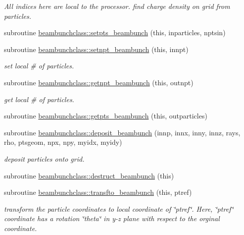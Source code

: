 \begin{DoxyCompactItemize}
\begin{DoxyCompactList}\small\item\em All indices here are local to the processor. find charge density on grid from particles. \end{DoxyCompactList}\item 
subroutine \mbox{\hyperlink{namespacebeambunchclass_a2cf9a1a04b69a4b2509d80522112a3bd}{beambunchclass\+::setpts\+\_\+beambunch}} (this, inparticles, nptsin)
\item 
subroutine \mbox{\hyperlink{namespacebeambunchclass_af1b14b706bd1283ff6c5a7cec4b06c48}{beambunchclass\+::setnpt\+\_\+beambunch}} (this, innpt)
\begin{DoxyCompactList}\small\item\em set local \# of particles. \end{DoxyCompactList}\item 
subroutine \mbox{\hyperlink{namespacebeambunchclass_aec332b229b76111b68db82b20ab2846e}{beambunchclass\+::getnpt\+\_\+beambunch}} (this, outnpt)
\begin{DoxyCompactList}\small\item\em get local \# of particles. \end{DoxyCompactList}\item 
subroutine \mbox{\hyperlink{namespacebeambunchclass_abc601844eaf85727173ebd3ef6d2b256}{beambunchclass\+::getpts\+\_\+beambunch}} (this, outparticles)
\item 
subroutine \mbox{\hyperlink{namespacebeambunchclass_aa0438cba132ce3b2fdc8e053375c0097}{beambunchclass\+::deposit\+\_\+beambunch}} (innp, innx, inny, innz, rays, rho, ptsgeom, npx, npy, myidx, myidy)
\begin{DoxyCompactList}\small\item\em deposit particles onto grid. \end{DoxyCompactList}\item 
subroutine \mbox{\hyperlink{namespacebeambunchclass_a0fe1e4d236f209b18f75b272bf07782d}{beambunchclass\+::destruct\+\_\+beambunch}} (this)
\item 
subroutine \mbox{\hyperlink{namespacebeambunchclass_aef2d76ba15a23896de0838b2001d72b1}{beambunchclass\+::transfto\+\_\+beambunch}} (this, ptref)
\begin{DoxyCompactList}\small\item\em transform the particle coordinates to local coordinate of \char`\"{}ptref\char`\"{}. Here, \char`\"{}ptref\char`\"{} coordinate has a rotation \char`\"{}theta\char`\"{} in y-\/z plane with respect to the orginal coordinate. \end{DoxyCompactList}\item 

\end{DoxyCompactItemize}
